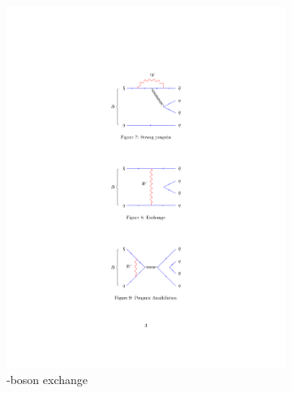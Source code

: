 \begin{figure}[!h]
\begin{subfigure}[b]{0.32\textwidth}
        \includegraphics[width=1.0\textwidth]{figs/Theory/Exch.pdf}
        \caption{\W-boson exchange}
        \label{fig:theory_exchange}
    \end{subfigure}
    \begin{subfigure}[b]{0.32\textwidth}
        \centering

\end{subfigure}
\end{figure}
